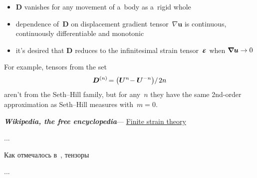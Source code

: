 \begin{itemize}
\item $\bm{D}$ vanishes for any movement of a~body as a~rigid whole
\item dependence of~$\bm{D}$ on displacement gradient tensor~${\nabla \bm{u}}$ is continuous, continuously differentiable and monotonic
\item it’s desired that $\bm{D}$ reduces to the infinitesimal strain tensor~${\mathboldepsilon}$ when ${\bm{\nabla}\hspace{-0.2ex} \bm{u} \to 0}$
\end{itemize}

\noindent For example, tensors from the set
\[ \displaystyle \bm{D}^{(n)} \hspace{-0.32ex} = \left( {\bm{U}}^{n} \hspace{-0.4ex} - {\bm{U}}^{-n} \right) \hspace{-0.4ex} / \hspace{.25ex} 2n \]
aren’t from the Seth\hbox{--}Hill family, but for any~$n$ they have the same 2nd\hbox{-}order approximation as Seth\hbox{--}Hill measures with~${m=0}$.

\vspace{.4em} \noindent \hfill \textbf{\emph{Wikipedia, the free encyclopedia}}\:--- \href{https://en.wikipedia.org/wiki/Finite_strain_theory}{Finite strain theory}

\vspace{1cm}

\begin{otherlanguage}{russian}

...

Как отмечалось в~, тензоры


...



\end{otherlanguage}



\label{para:velocityfield}

